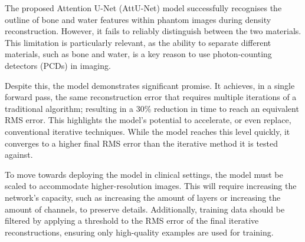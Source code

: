 \documentclass{article}
\begin{document}
The proposed Attention U-Net (AttU-Net) model successfully recognises the outline of bone and water features within phantom images during density reconstruction. However, it fails to reliably distinguish between the two materials. This limitation is particularly relevant, as the ability to separate different materials, such as bone and water, is a key reason to use photon-counting detectors (PCDs) in imaging.

Despite this, the model demonstrates significant promise. It achieves, in a single forward pass, the same reconstruction error that requires multiple iterations of a traditional algorithm; resulting in a 30\% reduction in time to reach an equivalent RMS error. This highlights the model's potential to accelerate, or even replace, conventional iterative techniques. While the model reaches this level quickly, it converges to a higher final RMS error than the iterative method it is tested against.

To move towards deploying the model in clinical settings, the model must be scaled to accommodate higher-resolution images. This will require increasing the network's capacity, such as increasing the amount of layers or increasing the amount of channels, to preserve details. Additionally, training data should be filtered by applying a threshold to the RMS error of the final iterative reconstructions, ensuring only high-quality examples are used for training.

\clearpage

\end{document}
